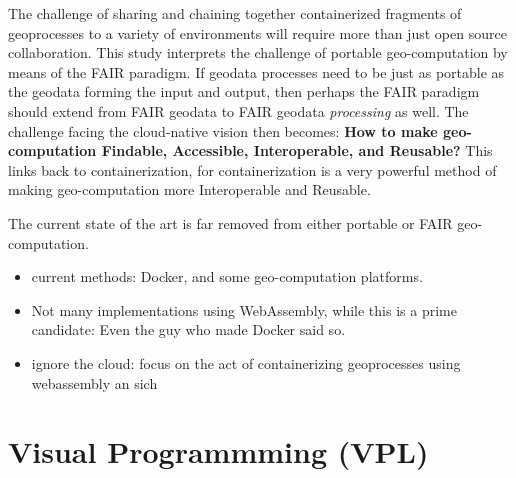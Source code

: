 The challenge of sharing and chaining together containerized fragments of geoprocesses to a variety of environments will require more than just open source collaboration. 
This study interprets the challenge of portable geo-computation by means of the FAIR paradigm. 
If geodata processes need to be just as portable as the geodata forming the input and output, then perhaps the FAIR paradigm should extend from FAIR geodata to FAIR geodata \emph{processing} as well.
The challenge facing the cloud-native vision then becomes: \textbf{How to make geo-computation Findable, Accessible, Interoperable, and Reusable?} 
This links back to containerization, for containerization is a very powerful method of making geo-computation more Interoperable and Reusable.

The current state of the art is far removed from either portable or FAIR geo-computation. 
\begin{itemize}
  \item current methods: Docker, and some geo-computation platforms.
  \item Not many implementations using WebAssembly, while this is a prime candidate: Even the guy who made Docker said so. 
  \item ignore the cloud: focus on the act of containerizing geoprocesses using webassembly an sich
\end{itemize}


\section{Visual Programmming (VPL)}
\label{sec:background-vpl}


